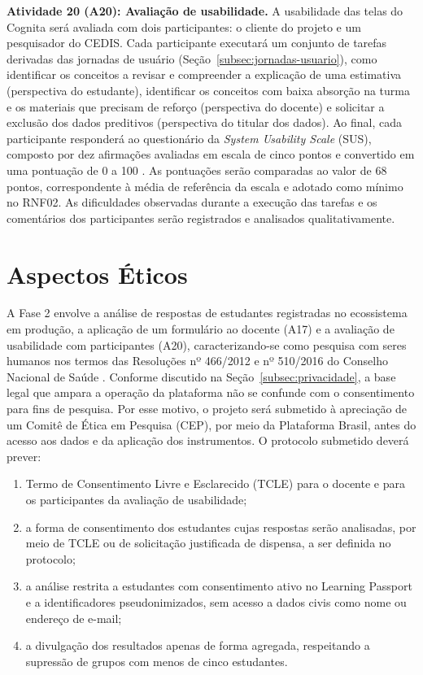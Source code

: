 \textbf{Atividade 20 (A20): Avaliação de usabilidade.} A usabilidade das telas do Cognita será avaliada com dois participantes: o cliente do projeto e um pesquisador do CEDIS. Cada participante executará um conjunto de tarefas derivadas das jornadas de usuário (Seção~\ref{subsec:jornadas-usuario}), como identificar os conceitos a revisar e compreender a explicação de uma estimativa (perspectiva do estudante), identificar os conceitos com baixa absorção na turma e os materiais que precisam de reforço (perspectiva do docente) e solicitar a exclusão dos dados preditivos (perspectiva do titular dos dados). Ao final, cada participante responderá ao questionário da \textit{System Usability Scale} (SUS), composto por dez afirmações avaliadas em escala de cinco pontos e convertido em uma pontuação de 0 a 100 \cite{brooke_sus_1996}. As pontuações serão comparadas ao valor de 68 pontos, correspondente à média de referência da escala \cite{sauro_practical_2011} e adotado como mínimo no RNF02. As dificuldades observadas durante a execução das tarefas e os comentários dos participantes serão registrados e analisados qualitativamente.

\section{Aspectos Éticos}
\label{sec:aspectos-eticos}

A Fase 2 envolve a análise de respostas de estudantes registradas no ecossistema em produção, a aplicação de um formulário ao docente (A17) e a avaliação de usabilidade com participantes (A20), caracterizando-se como pesquisa com seres humanos nos termos das Resoluções nº 466/2012 e nº 510/2016 do Conselho Nacional de Saúde \cite{brasil_resolucao_466_2012, brasil_resolucao_510_2016}. Conforme discutido na Seção~\ref{subsec:privacidade}, a base legal que ampara a operação da plataforma não se confunde com o consentimento para fins de pesquisa. Por esse motivo, o projeto será submetido à apreciação de um Comitê de Ética em Pesquisa (CEP), por meio da Plataforma Brasil, antes do acesso aos dados e da aplicação dos instrumentos. O protocolo submetido deverá prever:

\begin{enumerate}
    \item Termo de Consentimento Livre e Esclarecido (TCLE) para o docente e para os participantes da avaliação de usabilidade;
    \item a forma de consentimento dos estudantes cujas respostas serão analisadas, por meio de TCLE ou de solicitação justificada de dispensa, a ser definida no protocolo;
    \item a análise restrita a estudantes com consentimento ativo no Learning Passport e a identificadores pseudonimizados, sem acesso a dados civis como nome ou endereço de e-mail;
    \item a divulgação dos resultados apenas de forma agregada, respeitando a supressão de grupos com menos de cinco estudantes.
\end{enumerate}

